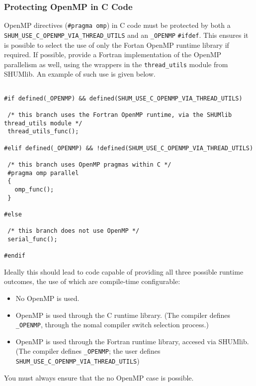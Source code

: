 \subsubsection*{Protecting OpenMP in C Code}
OpenMP directives (\verb|#pragma omp|) in C code must be protected by both a \verb|SHUM_USE_C_OPENMP_VIA_THREAD_UTILS| and an \verb|_OPENMP| \verb|#ifdef|.
This ensures it is possible to select the use of only the Fortan OpenMP runtime library if required.
If possible, provide a Fortran implementation of the OpenMP parallelism as well, using the wrappers in the \verb|thread_utils| module from SHUMlib.
An example of such use is given below.

\begin{minipage}{\linewidth}
\begin{verbatim}

#if defined(_OPENMP) && defined(SHUM_USE_C_OPENMP_VIA_THREAD_UTILS)

 /* this branch uses the Fortran OpenMP runtime, via the SHUMlib thread_utils module */
 thread_utils_func();

#elif defined(_OPENMP) && !defined(SHUM_USE_C_OPENMP_VIA_THREAD_UTILS)

 /* this branch uses OpenMP pragmas within C */
 #pragma omp parallel
 {
   omp_func();
 }

#else

 /* this branch does not use OpenMP */
 serial_func();

#endif

\end{verbatim}
\end{minipage}

Ideally this should lead to code capable of providing all three possible runtime outcomes, the use of which are compile-time configurable:

\begin{itemize}
\item No OpenMP is used.
\item OpenMP is used through the C runtime library. (The compiler defines \verb|_OPENMP|, through the nomal compiler switch selection process.)
\item OpenMP is used through the Fortran runtime library, accesed via SHUMlib. (The compiler defines \verb|_OPENMP|; the user defines \verb|SHUM_USE_C_OPENMP_VIA_THREAD_UTILS|)
\end{itemize}

You must always ensure that the no OpenMP case is possible.

